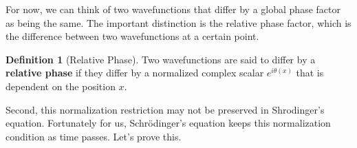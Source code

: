 \documentclass{article}
\theoremstyle{definition}
\newtheorem{definition}{Definition}[section]
\begin{document}
    For now, we can think of two wavefunctions that differ by a global phase factor as being the same. The important distinction is the relative phase factor, which is the difference between two wavefunctions at a certain point. 

    \begin{definition}[Relative Phase]
      Two wavefunctions are said to differ by a \textbf{relative phase} if they differ by a normalized complex scalar $e^{i \theta(x)}$ that is dependent on the position $x$.
    \end{definition}

    Second, this normalization restriction may not be preserved in Shrodinger's equation. Fortunately for us, Schr\"odinger's equation keeps this normalization condition as time passes. Let's prove this. 
\end{document}
